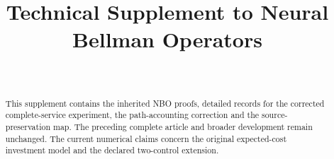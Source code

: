 \documentclass[ecta,nameyear,draft]{econsocart}
\begin{document}
\begin{frontmatter}
\title{Technical Supplement to Neural Bellman Operators}
\begin{aug}
\author[id=au1,addressref={add1}]{~}
\address[id=add1]{Peking University}
\end{aug}
\begin{abstract}
This supplement contains the inherited NBO proofs, detailed records for the corrected complete-service experiment, the path-accounting correction and the source-preservation map. The preceding complete article and broader development remain unchanged. The current numerical claims concern the original expected-cost investment model and the declared two-control extension.
\end{abstract}
\end{frontmatter}






\end{document}
